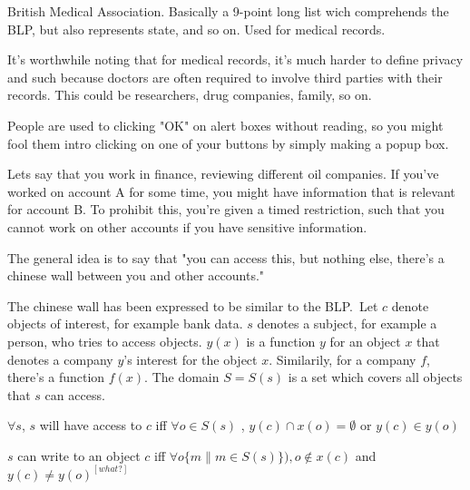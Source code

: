 \begin{definition}
    British Medical Association. 
    Basically a 9-point long list wich comprehends the BLP,
    but also represents state, and so on. Used for medical records.

    It's worthwhile noting that for medical records, it's much harder to
    define privacy and such because doctors are often required to involve
    third parties with their records. This could be researchers, drug companies,
    family, so on.
\end{definition}

\begin{definition}
    People are used to clicking "OK" on alert boxes without reading, so you
    might fool them intro clicking on one of your buttons by simply 
    making a popup box.
\end{definition}


\begin{definition}
    Lets say that you work in finance, reviewing different oil companies.
    If you've worked on account A for some time, you might have information
    that is relevant for account B. To prohibit this, you're given
    a timed restriction, such that you cannot work on other accounts 
    if you have sensitive information.

    The general idea is to say that "you can access this, but nothing else,
    there's a chinese wall between you and other accounts."

    The chinese wall has been expressed to be similar to the BLP.\
    Let $c$ denote objects of interest, for example bank data. $s$ 
    denotes a subject, for example a person, who tries to access objects.
    $y(x)$ is a function $y$ for an object $x$ that denotes a company $y$'s 
    interest for the object $x$. Similarily, for a company $f$, there's a 
    function $f(x)$. The domain $S = S(s)$ is a set which covers all
    objects that $s$ can access.

    \begin{description}[labelindent=1cm]
        \item[Simple security property]
            $\forall s$, $s$ will have access to $c$ iff $\forall o \in S(s)$
            , $y(c) \cap x(o) = \emptyset$ or $y(c) \in y(o)$
        \item[The *-property]
            $s$ can write to an object $c$ iff $\forall o\{m \| m \in S(s) \} ),
            o \notin x(c) $ and $y(c) \neq y(o)^{[what?]}$
    \end{description}
\end{definition}

